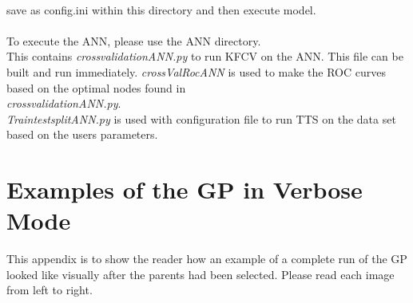 \documentclass[11pt]{article}
\begin{document}
\\
save as config.ini within this directory and then execute model.
\\
\\
To execute the ANN, please use the ANN directory.\\
This contains \textit{cross\textunderscore validation\textunderscore ANN.py} to run KFCV on the ANN. This file can be built and run immediately. 
\textit{crossValRoc\textunderscore ANN} is used to make the ROC curves based on the optimal nodes found in \\
\textit{cross\textunderscore validation\textunderscore ANN.py}. \\
\textit{Train\textunderscore test\textunderscore split\textunderscore ANN.py} is used with configuration file to run TTS on the data set based on the users parameters. 

\newpage
\section{Examples of the GP in Verbose Mode}
This appendix is to show the reader how an example of a complete run of the GP looked like visually after the parents had been selected.  Please read each image from left to right. \\
\end{document}
